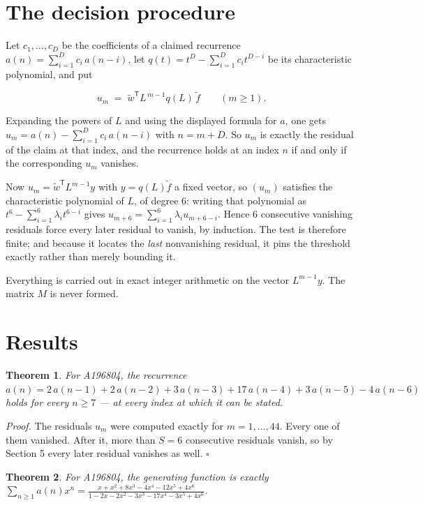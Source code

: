 \documentclass[11pt]{article}
\newtheorem{theorem}{Theorem}
\theoremstyle{definition}
\begin{document}
\section{The decision procedure}

Let $c_1,\dots,c_D$ be the coefficients of a claimed recurrence $a(n) = \sum_{i=1}^{D} c_i\,a(n-i)$, let $q(t) = t^{D} - \sum_{i=1}^{D} c_i t^{D-i}$ be its characteristic polynomial, and put

\[u_m \;=\; \tilde w^{\mathsf T} L^{\,m-1} q(L)\,\tilde f \qquad (m \ge 1).\]

Expanding the powers of $L$ and using the displayed formula for $a$, one gets $u_m = a(n) - \sum_{i=1}^{D} c_i\,a(n-i)$ with $n = m + D$. So $u_m$ is exactly the residual of the claim at that index, and the recurrence holds at an index $n$ if and only if the corresponding $u_m$ vanishes.

Now $u_m = \tilde w^{\mathsf T} L^{m-1} y$ with $y = q(L)\tilde f$ a fixed vector, so $(u_m)$ satisfies the characteristic polynomial of $L$, of degree $6$: writing that polynomial as $t^{6} - \sum_{i=1}^{6} \lambda_i t^{6-i}$ gives $u_{m+6} = \sum_{i=1}^{6} \lambda_i u_{m+6-i}$. Hence $6$ consecutive vanishing residuals force every later residual to vanish, by induction. The test is therefore finite; and because it locates the {\itshape last} nonvanishing residual, it pins the threshold exactly rather than merely bounding it.

Everything is carried out in exact integer arithmetic on the vector $L^{m-1}y$. The matrix $M$ is never formed.

\section{Results}

\begin{theorem} For A196804, the recurrence $a(n) = 2\,a(n-1) + 2\,a(n-2) + 3\,a(n-3) + 17\,a(n-4) + 3\,a(n-5) - 4\,a(n-6)$ holds for every $n \ge 7$ --- at every index at which it can be stated.\end{theorem}

{\itshape Proof.} The residuals $u_m$ were computed exactly for $m = 1,\dots,44$. Every one of them vanished. After it, more than $S = 6$ consecutive residuals vanish, so by Section 5 every later residual vanishes as well. $\square$

\begin{theorem} For A196804, the generating function is exactly $\sum_{n\ge 1} a(n)x^n = \frac{x + x^{2} + 8x^{3} - 4x^{4} - 12x^{5} + 4x^{6}}{1 - 2x - 2x^{2} - 3x^{3} - 17x^{4} - 3x^{5} + 4x^{6}}$.\end{theorem}
\end{document}
